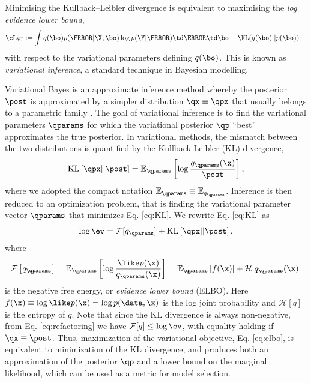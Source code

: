 Minimising the Kullback--Leibler divergence is equivalent to maximising the \textit{log evidence lower bound},
\begin{align}
&\cL_{\text{VI}} := \int q(\bo) p(\F | \X, \bo) \log p(\Y | \F) \td \F \td \bo - \KL(q(\bo) || p(\bo)) \label{eq:L:VI}
\end{align}
with respect to the variational parameters defining $q(\bo)$. This is known as \textit{variational inference}, a standard technique in Bayesian modelling.


Variational Bayes is an approximate inference method whereby the posterior $\post$ is approximated by a simpler distribution $\qx \equiv \qpx$ that usually belongs to a parametric family \cite{jordan1999introduction,bishop2006pattern}. The goal of variational inference is to find the variational parameters $\qparams$ for which the variational posterior $\qp$ ``best'' approximates the true posterior. In variational methods, the mismatch between the two distributions is quantified by the Kullback-Leibler (KL) divergence,
\begin{equation} \label{eq:KL}
\text{KL}\left[\qpx || \post\right] = \mathbb{E}_{\qparams} \left[\log \frac{q_{\qparams}(\x)}{\post} \right],
\end{equation}
where we adopted the compact notation $\mathbb{E}_{\qparams} \equiv \mathbb{E}_{q_{\qparams}}$.
Inference is then reduced to an optimization problem, that is finding the variational parameter vector $\qparams$ that minimizes Eq. \ref{eq:KL}. %
We rewrite Eq. \ref{eq:KL} as
\begin{equation} \label{eq:refactoring}
\log \ev = \mathcal{F}[q_{\qparams}] + \text{KL}\left[\qpx || \post\right],
\end{equation}
where
\begin{equation} \label{eq:elbo}
\mathcal{F}\left[ q_{\qparams} \right] =  \mathbb{E}_{\qparams} \left[\log \frac{\like p(\x)}{q_{\qparams}(\x)} \right] = \mathbb{E}_{\qparams} \left[f(\x) \right] + \mathcal{H}[q_{\qparams}(\x)] 
\end{equation}
is the negative free energy, or \emph{evidence lower bound} (ELBO). Here $f(\x) \equiv \log \like p(\x) = \log p(\data, \x)$ is the log joint probability and $\mathcal{H}[q]$ is the entropy of $q$. Note that since the KL divergence is always non-negative, from Eq. \ref{eq:refactoring} we have $\mathcal{F}[q] \le \log \ev$, with equality holding if $\qx \equiv \post$. Thus, maximization of the variational objective, Eq. \ref{eq:elbo}, is equivalent to minimization of the KL divergence, and produces both an approximation of the posterior $\qp$ and a lower bound on the marginal likelihood, which can be used as a metric for model selection.

